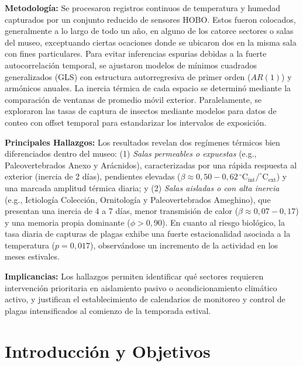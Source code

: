 \documentclass[11pt,a4paper]{article}
\begin{document}
\textbf{Metodología:} Se procesaron registros continuos de temperatura y humedad capturados por un conjunto reducido de sensores HOBO. Estos fueron colocados, generalmente a lo largo de todo un año, en alguno de los catorce sectores o salas del museo, exceptuando ciertas ocaciones donde se ubicaron dos en la misma sala con fines particulares. Para evitar inferencias espurias debidas a la fuerte autocorrelación temporal, se ajustaron modelos de mínimos cuadrados generalizados (GLS) con estructura autorregresiva de primer orden ($AR(1)$) y armónicos anuales. La inercia térmica de cada espacio se determinó mediante la comparación de ventanas de promedio móvil exterior. Paralelamente, se exploraron las tasas de captura de insectos mediante modelos para datos de conteo con offset temporal para estandarizar los intervalos de exposición.

\textbf{Principales Hallazgos:} Los resultados revelan dos regímenes térmicos bien diferenciados dentro del museo: (1) \textit{Salas permeables o expuestas} (e.g., Paleovertebrados Anexo y Arácnidos), caracterizadas por una rápida respuesta al exterior (inercia de 2 días), pendientes elevadas ($\beta \approx 0{,}50 - 0{,}62\,^\circ\text{C}_\text{int}/^\circ\text{C}_\text{ext}$) y una marcada amplitud térmica diaria; y (2) \textit{Salas aisladas o con alta inercia} (e.g., Ictiología Colección, Ornitología y Paleovertebrados Ameghino), que presentan una inercia de 4 a 7 días, menor transmisión de calor ($\beta \approx 0{,}07 - 0{,}17$) y una memoria propia dominante ($\phi > 0{,}90$). En cuanto al riesgo biológico, la tasa diaria de capturas de plagas exhibe una fuerte estacionalidad asociada a la temperatura ($p = 0{,}017$), observándose un incremento de la actividad en los meses estivales.

\textbf{Implicancias:} Los hallazgos permiten identificar qué sectores requieren intervención prioritaria en aislamiento pasivo o acondicionamiento climático activo, y justifican el establecimiento de calendarios de monitoreo y control de plagas intensificados al comienzo de la temporada estival.

\newpage

\section{Introducción y Objetivos}
\end{document}
